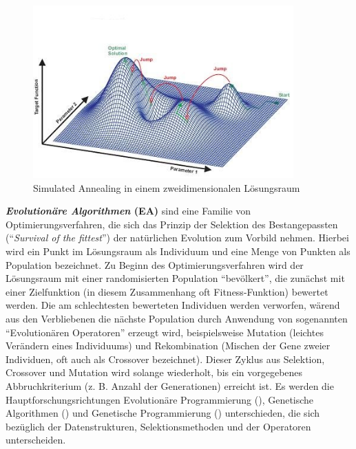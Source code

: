 \begin{figure}[ht]
\centering
\includegraphics[width=10cm]{graphics/SimAnn.jpg}
\caption{Simulated Annealing in einem zweidimensionalen L\"osungsraum}
\label{fig6}
\end{figure}

\textbf{\textit{Evolution\"are Algorithmen} (EA)} sind eine Familie von Optimierungsverfahren, die sich das Prinzip der Selektion des Bestangepassten ("`\textit{Survival of the fittest}"') der nat\"urlichen Evolution zum Vorbild nehmen. Hierbei wird ein Punkt im L\"osungsraum als Individuum und eine Menge von Punkten als Population bezeichnet. Zu Beginn des Optimierungsverfahren wird der 
L\"osungsraum mit einer randomisierten Population "`bev\"olkert"', die zun\"achst mit einer Zielfunktion (in diesem Zusammenhang oft Fitness-Funktion) bewertet werden. Die am schlechtesten bewerteten Individuen werden verworfen, w\"arend aus den Verbliebenen die n\"achste Population durch Anwendung von sogenannten "`Evolutionären Operatoren"' erzeugt wird, beispielsweise Mutation
(leichtes Verändern eines Individuums) und Rekombination (Mischen der Gene zweier Individuen, oft auch als Crossover bezeichnet).
Dieser Zyklus aus Selektion, Crossover und Mutation wird solange wiederholt, bis ein vorgegebenes Abbruchkriterium (z. B. Anzahl der Generationen) erreicht ist.
Es werden die Hauptforschungsrichtungen Evolution\"are Programmierung (\cite{FogelAIsimEvo}), Genetische Algorithmen (\cite{GoldbergAISimEvo}) und Genetische Programmierung (\cite{KozaAIsimEvo}) unterschieden, die sich bez\"uglich der Datenstrukturen, Selektionsmethoden und der Operatoren unterscheiden.

